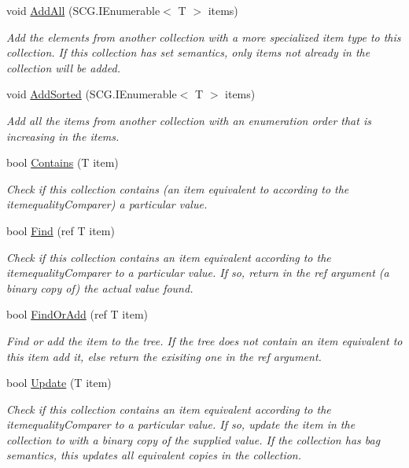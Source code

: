 \begin{DoxyCompactItemize}
void \hyperlink{class_c5_1_1_tree_set_a031b4f4a9ad4b680637f865b9f1e255c}{Add\+All} (S\+C\+G.\+I\+Enumerable$<$ T $>$ items)
\begin{DoxyCompactList}\small\item\em Add the elements from another collection with a more specialized item type to this collection. If this collection has set semantics, only items not already in the collection will be added. \end{DoxyCompactList}\item 
void \hyperlink{class_c5_1_1_tree_set_af24a9110aa1b562a8c3a159307e1bb38}{Add\+Sorted} (S\+C\+G.\+I\+Enumerable$<$ T $>$ items)
\begin{DoxyCompactList}\small\item\em Add all the items from another collection with an enumeration order that is increasing in the items. \end{DoxyCompactList}\item 
bool \hyperlink{class_c5_1_1_tree_set_ac64161083bb695c31f6b459d4bd8c13e}{Contains} (T item)
\begin{DoxyCompactList}\small\item\em Check if this collection contains (an item equivalent to according to the itemequality\+Comparer) a particular value. \end{DoxyCompactList}\item 
bool \hyperlink{class_c5_1_1_tree_set_a6c2fb30b79c7a0a7212804503c0db97e}{Find} (ref T item)
\begin{DoxyCompactList}\small\item\em Check if this collection contains an item equivalent according to the itemequality\+Comparer to a particular value. If so, return in the ref argument (a binary copy of) the actual value found. \end{DoxyCompactList}\item 
bool \hyperlink{class_c5_1_1_tree_set_ae73144d09bef526e903714cd013fedb6}{Find\+Or\+Add} (ref T item)
\begin{DoxyCompactList}\small\item\em Find or add the item to the tree. If the tree does not contain an item equivalent to this item add it, else return the exisiting one in the ref argument. \end{DoxyCompactList}\item 
bool \hyperlink{class_c5_1_1_tree_set_a8f1700589d1f048da1f66c260bb83c2f}{Update} (T item)
\begin{DoxyCompactList}\small\item\em Check if this collection contains an item equivalent according to the itemequality\+Comparer to a particular value. If so, update the item in the collection to with a binary copy of the supplied value. If the collection has bag semantics, this updates all equivalent copies in the collection. \end{DoxyCompactList}\item 

\end{DoxyCompactItemize}

